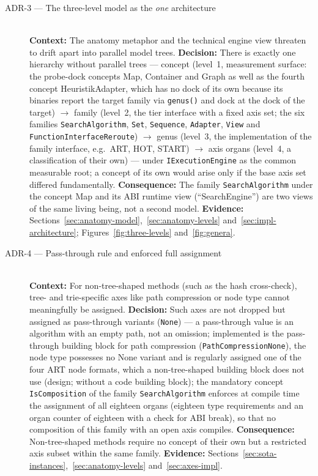 \begin{description}
  \item[ADR-3 --- The three-level model as the \emph{one} architecture]\hfill\\
  \textbf{Context:} The anatomy metaphor and the technical engine view threaten to drift apart
  into parallel model trees.
  \textbf{Decision:} There is exactly one hierarchy without parallel trees --- concept (level~1,
  measurement surface: the probe-dock concepts Map, Container and Graph as well as the fourth concept
  HeuristikAdapter, which has no dock of its own because its binaries report the target family via
  \texttt{genus()} and dock at the dock of the target) $\to$ family (level~2, the tier interface with
  a fixed axis set; the six families \texttt{SearchAlgorithm}, \texttt{Set},
  \texttt{Sequence}, \texttt{Adapter}, \texttt{View} and \texttt{FunctionInterfaceReroute}) $\to$
  genus (level~3, the implementation of the family interface, e.g.\ ART, HOT, START) $\to$
  axis organs (level~4, a classification of their own) --- under \texttt{IExecutionEngine} as the
  common measurable root; a concept
  of its own would arise only if the base axis set differed fundamentally.
  \textbf{Consequence:} The family \texttt{SearchAlgorithm} under the concept Map and its ABI runtime
  view (\enquote{SearchEngine}) are two views of the same living being, not a second model.
  \textbf{Evidence:} Sections~\ref{sec:anatomy-model},~\ref{sec:anatomy-levels}
  and~\ref{sec:impl-architecture}; Figures~\ref{fig:three-levels} and~\ref{fig:genera}.

  \item[ADR-4 --- Pass-through rule and enforced full assignment]\hfill\\
  \textbf{Context:} For non-tree-shaped methods (such as the hash cross-check), tree- and
  trie-specific axes like path compression or node type cannot meaningfully be assigned.
  \textbf{Decision:} Such axes are not dropped but assigned as pass-through variants
  (\texttt{None}) --- a pass-through value is an algorithm with an empty path, not an omission;
  implemented is the pass-through building block for path compression
  (\texttt{Path\allowbreak{}Compression\allowbreak{}None}), the node type possesses no None variant
  and is regularly assigned one of the four ART node formats, which a non-tree-shaped building block
  does not use (design; without a code building block); the mandatory concept
  \texttt{IsComposition} of the family \texttt{SearchAlgorithm} enforces at compile time the
  assignment of all eighteen organs (eighteen type requirements and an organ counter of eighteen
  with a check for ABI break), so that no composition of this family with an open axis compiles.
  \textbf{Consequence:} Non-tree-shaped methods require no concept of their own but a restricted
  axis subset within the same family.
  \textbf{Evidence:} Sections~\ref{sec:sota-instances},~\ref{sec:anatomy-levels}
  and~\ref{sec:axes-impl}.


\end{description}
